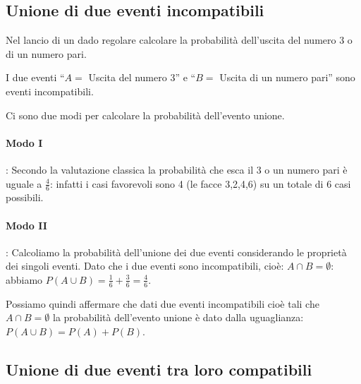 \subsection{Unione di due eventi incompatibili}

\begin{esempio}
Nel lancio di un dado regolare calcolare la probabilità dell'uscita del 
numero 
3 
o di un numero pari.

I due eventi ``$ A= $ Uscita del numero 3'' e ``$ B= $ Uscita di un numero 
pari'' sono eventi incompatibili.

Ci sono due modi per calcolare la probabilità dell'evento unione.
\paragraph{Modo I}: Secondo la valutazione classica la probabilità che esca 
il 
$3$ o un numero pari è uguale a $\frac 4 6$: infatti i casi favorevoli sono 4 
(le facce 3,2,4,6) su un totale di $6$ casi possibili.
\paragraph{Modo II}: Calcoliamo la probabilità dell'unione dei due eventi 
considerando le proprietà dei singoli eventi. Dato che i due eventi sono 
incompatibili, cioè: $A\cap B=\emptyset $: abbiamo $P(A\cup B)=\frac 1 
6+\frac 
3 
6=\frac 4 6$.

\end{esempio}

Possiamo quindi affermare che dati due eventi incompatibili cioè tali che 
$A\cap 
B=\emptyset $ la probabilità dell'evento unione è dato dalla uguaglianza: 
$P(A\cup B)=P(A)+P(B)$.


\subsection{Unione di due eventi tra loro compatibili}

